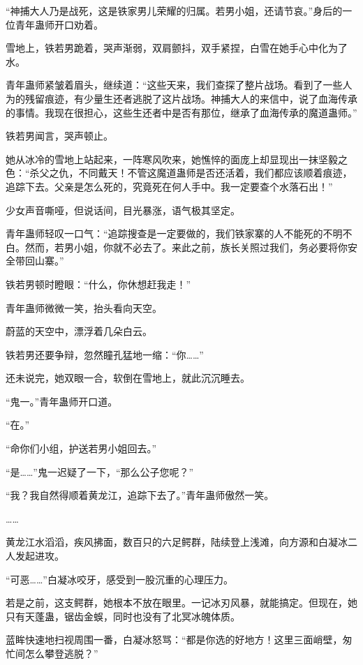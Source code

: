 
\begin{this_body}

“神捕大人乃是战死，这是铁家男儿荣耀的归属。若男小姐，还请节哀。”身后的一位青年蛊师开口劝着。

雪地上，铁若男跪着，哭声渐弱，双肩颤抖，双手紧捏，白雪在她手心中化为了水。

青年蛊师紧皱着眉头，继续道：“这些天来，我们查探了整片战场。看到了一些人为的残留痕迹，有少量生还者逃脱了这片战场。神捕大人的来信中，说了血海传承的事情。我现在很担心，这些生还者中是否有那位，继承了血海传承的魔道蛊师。”

铁若男闻言，哭声顿止。

她从冰冷的雪地上站起来，一阵寒风吹来，她憔悴的面庞上却显现出一抹坚毅之色：“杀父之仇，不同戴天！不管这魔道蛊师是否还活着，我们都应该顺着痕迹，追踪下去。父亲是怎么死的，究竟死在何人手中。我一定要查个水落石出！”

少女声音嘶哑，但说话间，目光暴涨，语气极其坚定。

青年蛊师轻叹一口气：“追踪搜查是一定要做的，我们铁家寨的人不能死的不明不白。然而，若男小姐，你就不必去了。来此之前，族长关照过我们，务必要将你安全带回山寨。”

铁若男顿时瞪眼：“什么，你休想赶我走！”

青年蛊师微微一笑，抬头看向天空。

蔚蓝的天空中，漂浮着几朵白云。

铁若男还要争辩，忽然瞳孔猛地一缩：“你……”

还未说完，她双眼一合，软倒在雪地上，就此沉沉睡去。

“鬼一。”青年蛊师开口道。

“在。”

“命你们小组，护送若男小姐回去。”

“是……”鬼一迟疑了一下，“那么公子您呢？”

“我？我自然得顺着黄龙江，追踪下去了。”青年蛊师傲然一笑。

……

黄龙江水滔滔，疾风拂面，数百只的六足鳄群，陆续登上浅滩，向方源和白凝冰二人发起进攻。

“可恶……”白凝冰咬牙，感受到一股沉重的心理压力。

若是之前，这支鳄群，她根本不放在眼里。一记冰刃风暴，就能搞定。但现在，她只有天蓬蛊，锯齿金蜈，同时也没有了北冥冰魄体质。

蓝眸快速地扫视周围一番，白凝冰怒骂：“都是你选的好地方！这里三面峭壁，匆忙间怎么攀登逃脱？”


\end{this_body}
